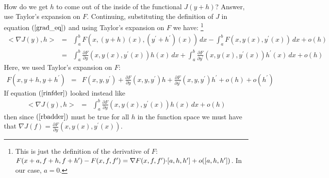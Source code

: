 \documentclass{article}
\begin{document}
How do we get $h$ to come out of the inside of the functional $J(y+h)$? Answer, use
Taylor's expansion on $F$. Continuing, substituting the definition of $J$ in equation
$(\ref{grad_eq})$ and using Taylor's expansion on $F$ we have:%
\footnote{This is just the definition of the derivative of $F$:
$F(x + a, f+h, f+h^\prime) - F(x,f,f^\prime) = \nabla F(x,f,f^\prime) {\bf \cdot} [a,h,h^\prime] + o([a,h,h^\prime])$. In our case, $a = 0$.
}
\begin{eqnarray}
  <\!\nabla J(y), h\!>  & = & \int_a^b F(x, (y+h)(x), (y^\prime + h^\prime)(x)) \, dx
  - \int_a^b F(x, y(x), y^\prime(x)) \, dx  + o(h) \nonumber \\
& = & \int_a^b \frac{\partial F}{\partial y}(x, y(x), y^\prime(x))h(x)\, dx
+ \int_a^b \frac{\partial F}{\partial y^\prime}(x, y(x), y^\prime(x))h^\prime(x) \, dx
+ o(h) \label{rinfder}
\end{eqnarray}
Here, we used Taylor's expansion on $F$:
\begin{eqnarray}
  F(x, y+h, y+h^\prime) & = & F(x,y,y^\prime) + \frac{\partial F}{\partial y}(x,y,y^\prime) h + \frac{\partial F}{\partial
    y^\prime}(x,y,y^\prime) h^\prime + o(h) + o(h^\prime)
\end{eqnarray}
If equation $(\ref{rinfder})$ looked instead like
\begin{eqnarray}
  <\!\nabla J(y), h\!>  & = &
 \int_a^b \frac{\partial F}{\partial y}(x, y(x), y^\prime(x))h(x)\, dx
+ o(h) \label{rbadder}
\end{eqnarray}
then since $(\ref{rbadder})$ must be true for all $h$ in the function space we must
have that $\nabla J(f) = \frac{\partial F}{\partial y}(x, y(x), y^\prime(x))$.
\end{document}
